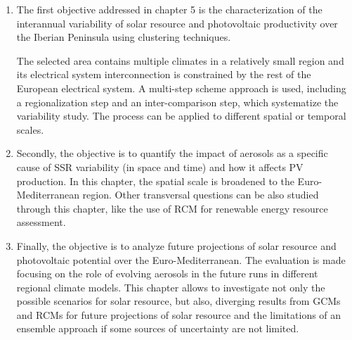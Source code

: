 \begin{enumerate}
\item The first objective addressed in chapter 5 is the characterization of the interannual variability of solar resource and photovoltaic productivity over the Iberian Peninsula using clustering techniques.

  The selected area contains multiple climates in a relatively small region and its electrical system interconnection is constrained by the rest of the European electrical system. A multi-step scheme approach is used, including a regionalization step and an inter-comparison step, which systematize the variability study. The process can be applied to different spatial or temporal scales.

\item Secondly, the objective is to quantify the impact of aerosols as a specific cause of SSR variability (in space and time)  and how it affects PV production. In this chapter, the spatial scale is broadened to the Euro-Mediterranean region. Other transversal questions can be also studied through this chapter, like the use of RCM for renewable energy resource assessment.

\item Finally, the objective is to analyze future projections  of solar resource and photovoltaic potential over the Euro-Mediterranean. The evaluation is made focusing on the role of evolving aerosols in the future runs in different regional climate models. This chapter allows to investigate not only the possible scenarios for solar resource, but also, diverging results from GCMs and RCMs for future projections of solar resource and the limitations of an ensemble approach if some sources of uncertainty are not limited.

\end{enumerate}  





% 